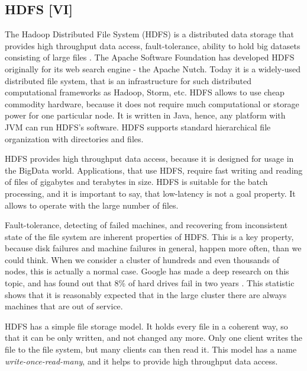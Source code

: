 \subsection{HDFS [VI]}
\label{subs:HDFS}

The Hadoop Distributed File System (HDFS) is a distributed data storage that provides high throughput data access, fault-tolerance, ability to hold big datasets consisting of large files \cite{HDFSArchitecture1, HDFSArchitecture2}.
The Apache Software Foundation has developed HDFS originally for its web search engine - the Apache Nutch.
Today it is a widely-used distributed file system, that is an infrastructure for such distributed computational frameworks as Hadoop, Storm, etc.
HDFS allows to use cheap commodity hardware, because it does not require much computational or storage power for one particular node.
It is written in Java, hence, any platform with JVM \cite{JVM} can run HDFS's software.
HDFS supports standard hierarchical file organization with directories and files.


HDFS provides high throughput data access, because it is designed for usage in the BigData world.
Applications, that use HDFS, require fast writing and reading of files of gigabytes and terabytes in size.
HDFS is suitable for the batch processing, and it is important to say, that low-latency is not a goal property.
It allows to operate with the large number of files.

Fault-tolerance, detecting of failed machines, and recovering from inconsistent state of the file system are inherent properties of HDFS.
This is a key property, because disk failures and machine failures in general, happen more often, than we could think.
When we consider a cluster of hundreds and even thousands of nodes, this is actually a normal case.
Google has made a deep research on this topic, and has found out that 8\% of hard drives fail in two years \cite{Pinheiro2007}.
This statistic shows that it is reasonably expected that in the large cluster there are always machines that are out of service.

HDFS has a simple file storage model.
It holds every file in a coherent way, so that it can be only written, and not changed any more.
Only one client writes the file to the file system, but many clients can then read it.
This model has a name \textit{write-once-read-many}, and it helps to provide high throughput data access.

